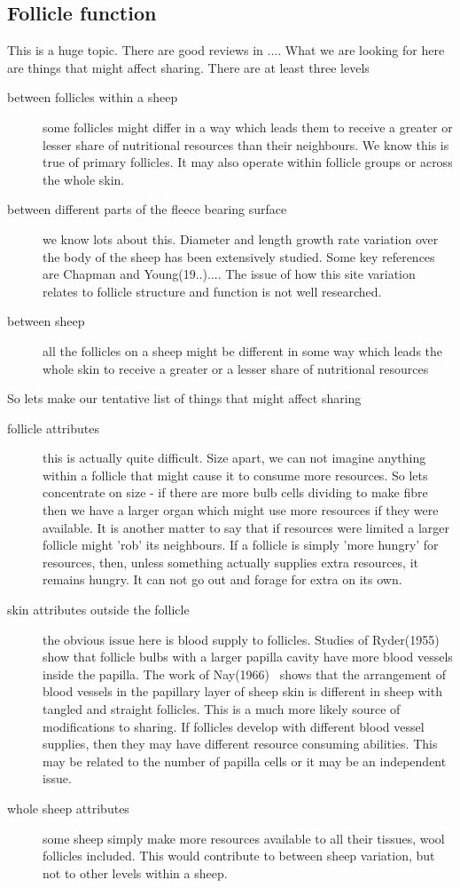 \documentclass[titlepage]{article}  %
\begin{document}
\subsection{Follicle function}
This is a huge topic. There are good reviews in .... What we are looking for here are things that might affect sharing. There are at least three levels
\begin{description}
\item[between follicles within a sheep] some follicles might differ in a way which leads them to receive a greater or lesser share of nutritional resources than their neighbours. We know this is true of primary follicles. It may also operate within follicle groups or across the whole skin. 
\item[between different parts of the fleece bearing surface] we know lots about this. Diameter and length growth rate variation over the body of the sheep has been extensively studied. Some key references are Chapman and Young(19..).... The issue of how this site variation relates to follicle structure and function is not well researched.
\item[between sheep] all the follicles on a sheep might be different in some way which leads the whole skin to receive a greater or a lesser share of nutritional resources
\end{description}

So lets make our tentative list of things that might affect sharing
\begin{description}
\item[follicle attributes] this is actually quite difficult. Size apart, we can not imagine anything within a follicle that might cause it to consume more resources.  So lets concentrate on size - if there are more bulb cells dividing to make fibre then we have a larger organ which might use more resources if they were available.  It is another matter to say that if resources were limited a larger follicle might 'rob' its neighbours.  If a follicle is simply 'more hungry' for resources, then, unless something actually supplies extra resources, it remains hungry. It can not go out and forage for extra on its own.
\item[skin attributes outside the follicle] the obvious issue here is blood supply to follicles. Studies of Ryder(1955)~\cite{ryde:55} show that follicle bulbs with a larger papilla cavity have more blood vessels inside the papilla. The work of Nay(1966)~\cite{nay:66} shows that the arrangement of blood vessels in the papillary layer of sheep skin is different in sheep with tangled and straight follicles. This is a much more likely source of modifications to sharing. If follicles develop with different blood vessel supplies, then they may have different resource consuming abilities. This may be related to the number of papilla cells or it may be an independent issue.
\item[whole sheep attributes]  some sheep simply make more resources available to all their tissues, wool follicles included. This would contribute to between sheep variation, but not to other levels within a sheep.
\end{description}
\end{document}
